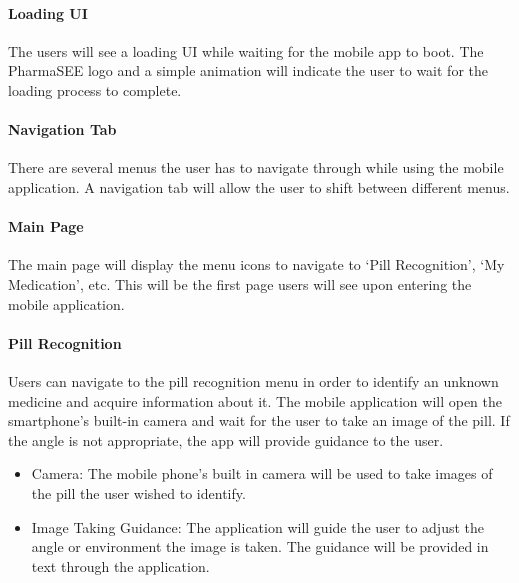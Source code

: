 \documentclass[conference]{IEEEtran}
\begin{document}
\paragraph{Loading UI}The users will see a loading UI while waiting for the mobile app to boot. The PharmaSEE logo and a simple animation will indicate the user to wait for the loading process to complete.\\

\paragraph{Navigation Tab}There are several menus the user has to navigate through while using the mobile application. A navigation tab will allow the user to shift between different menus. \\
\paragraph{Main Page}The main page will display the menu icons to navigate to ‘Pill Recognition’, ‘My Medication’, etc. This will be the first page users will see upon entering the mobile application.\\

\paragraph{Pill Recognition}Users can navigate to the pill recognition menu in order to identify an unknown medicine and acquire information about it. The mobile application will open the smartphone’s built-in camera and wait for the user to take an image of the pill. If the angle is not appropriate, the app will provide guidance to the user.\\

\begin{itemize}
\item Camera: The mobile phone’s built in camera will be used to take images of the pill the user wished to identify.\\

\item Image Taking Guidance: The application will guide the user to adjust the angle or environment the image is taken. The guidance will be provided in text through the application.\\
\end{itemize}
\end{document}
